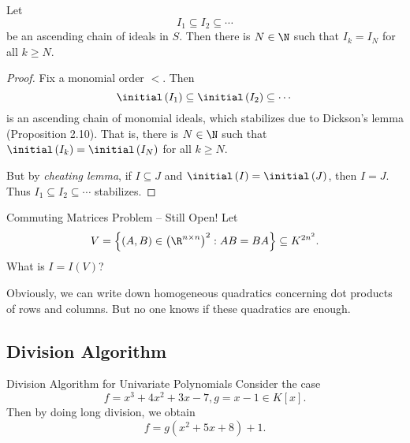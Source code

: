 \documentclass[co439]{subfiles}
\begin{document}
    \begin{cor}{}
        Let
        \begin{equation*}
            I_1\subseteq I_2\subseteq\cdots
        \end{equation*}
        be an ascending chain of ideals in $S$. Then there is $N\in\N$ such that $I_k=I_N$ for all $k\geq N$.
    \end{cor}	
    
    \begin{proof}
        Fix a monomial order $<$. Then
        \begin{equation*}
            \initial\left( I_1 \right)\subseteq\initial\left( I_2 \right)\subseteq\cdots
        \end{equation*}
        is an ascending chain of monomial ideals, which stabilizes due to Dickson's lemma (Proposition 2.10). That is, there is $N\in\N$ such that $\initial\left( I_k \right)=\initial\left( I_N \right)$ for all $k\geq N$. 

        But by \textit{cheating lemma}, if $I\subseteq J$ and $\initial\left( I \right)=\initial\left( J \right)$, then $I=J$. Thus $I_1\subseteq I_2\subseteq\cdots$ stabilizes.
    \end{proof}

    \begin{example}{Commuting Matrices Problem -- Still Open!}
        Let
        \begin{equation*}
            V = \left\lbrace \left( A,B \right)\in \left( \R^{n\times n} \right)^{2} : AB=BA \right\rbrace\subseteq K^{2n^2}.
        \end{equation*}
        What is $I = I\left( V \right)$?

        Obviously, we can write down homogeneous quadratics concerning dot products of rows and columns. But no one knows if these quadratics are enough.
    \end{example}

    \rruleline

    \subsection{Division Algorithm}

    \begin{example}{Division Algorithm for Univariate Polynomials}
        Consider the case
        \begin{equation*}
            f = x^{3}+4x^{2}+3x-7, g = x-1\in K\left[ x \right].
        \end{equation*}
        Then by doing long division, we obtain
        \begin{equation*}
            f = g \left( x^{2}+5x+8 \right) + 1.
        \end{equation*}
    \end{example}
\end{document}
